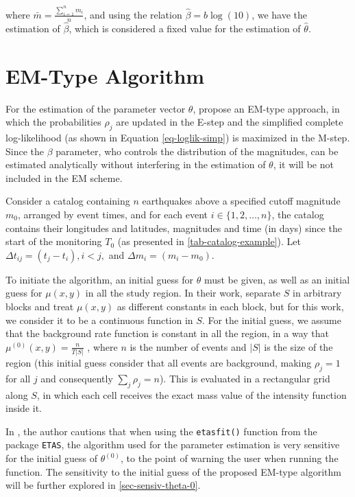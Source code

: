 \noindent where $\bar{m} = \frac{\sum_{i = 1}^{n}m_{i}}{n}$, and using the relation $\hat{\beta} = \hat{b}\log(10)$, we have the estimation of $\hat{\beta}$, which is considered a fixed value for the estimation of $\hat{\theta}$.

\section{EM-Type Algorithm}
\label{sec-em-type-alg}

For the estimation of the parameter vector $\theta$,  propose an EM-type approach, in which the probabilities $\rho_{j}$ are updated in the E-step and the simplified complete log-likelihood (as shown in Equation \eqref{eq-loglik-simp}) is maximized in the M-step. Since the $\beta$ parameter, who controls the distribution of the magnitudes, can be estimated analytically without interfering in the estimation of $\theta$, it will be not included in the EM scheme.

Consider a catalog containing $n$ earthquakes above a specified cutoff magnitude $m_{0}$, arranged by event times, and for each event $i \in \{1,2,\ldots,n\}$, the catalog contains their longitudes and latitudes, magnitudes and time (in days) since the start of the monitoring $T_{0}$ (as presented in \autoref{tab-catalog-example}). Let $\Delta t_{ij} = (t_{j} - t_{i}), i<j,$ and $\Delta m_{i} = (m_{i} - m_{0})$.

To initiate the algorithm, an initial guess for $\theta$ must be given, as well as an initial guess for $\mu(x,y)$ in all the study region. In their work,  separate $S$ in arbitrary blocks and treat $\mu(x,y)$ as different constants in each block, but for this work, we consider it to be a continuous function in $S$. For the initial guess, we assume that the background rate function is constant in all the region, in a way that $\mu^{(0)}(x,y) = \frac{n}{T|S|}$ , where $n$ is the number of events and $|S|$ is the size of the region (this initial guess consider that all events are background, making $\rho_{j} = 1$ for all $j$ and consequently $\sum_{j}\rho_{j} = n$). This is evaluated in a rectangular grid along $S$, in which each cell receives the exact mass value of the intensity function inside it.

In , the author cautions that when using the \texttt{etasfit()} function from the package \texttt{ETAS}, the algorithm used for the parameter estimation is very sensitive for the initial guess of $\theta^{(0)}$, to the point of warning the user when running the function. The sensitivity to the initial guess of the proposed EM-type algorithm will be further explored in \autoref{sec-sensiv-theta-0}.

